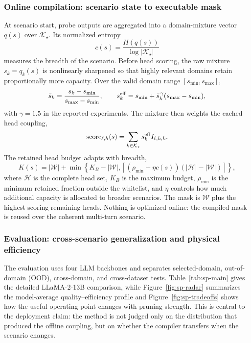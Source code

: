 \documentclass[12pt,a4paper]{article}
\begin{document}
\subsubsection{Online compilation: scenario state to executable mask}
At scenario start, probe outputs are aggregated into a domain-mixture vector $q(s)$ over $\mathcal K_\star$. Its normalized entropy
\begin{equation}
c(s)=\frac{H(q(s))}{\log|\mathcal K_\star|}
\label{eq:sp-breadth}
\end{equation}
measures the breadth of the scenario. Before head scoring, the raw mixture $s_k=q_k(s)$ is nonlinearly sharpened so that highly relevant domains retain proportionally more capacity. Over the valid domain range $[s_{\min},s_{\max}]$,
\begin{equation}
\bar s_k=\frac{s_k-s_{\min}}{s_{\max}-s_{\min}},\qquad
s_k^{\rm eff}=s_{\min}+\bar s_k^{\,\gamma}(s_{\max}-s_{\min}),
\label{eq:sp-effective}
\end{equation}
with $\gamma=1.5$ in the reported experiments. The mixture then weights the cached head coupling,
\begin{equation}
\operatorname{score}_{\ell,h}(s)=\sum_{k\in\mathcal K_\star}s_k^{\rm eff}I_{\ell,h,k}.
\label{eq:sp-score}
\end{equation}
The retained head budget adapts with breadth,
\begin{equation}
K(s)=|\mathcal W|+\min\!\left\{K_B-|\mathcal W|,
\left\lceil(\rho_{\min}+\eta c(s))(|\mathcal H|-|\mathcal W|)\right\rceil\right\},
\label{eq:sp-budget}
\end{equation}
where $\mathcal H$ is the complete head set, $K_B$ is the maximum budget, $\rho_{\min}$ is the minimum retained fraction outside the whitelist, and $\eta$ controls how much additional capacity is allocated to broader scenarios. The mask is $\mathcal W$ plus the highest-scoring remaining heads. Nothing is optimized online: the compiled mask is reused over the coherent multi-turn scenario.

\subsubsection{Evaluation: cross-scenario generalization and physical efficiency}
The evaluation uses four LLM backbones and separates selected-domain, out-of-domain (OOD), cross-domain, and cross-dataset tests. Table~\ref{tab:sp-main} gives the detailed LLaMA-2-13B comparison, while Figure~\ref{fig:sp-radar} summarizes the model-average quality--efficiency profile and Figure~\ref{fig:sp-tradeoffs} shows how the useful operating point changes with pruning strength. This is central to the deployment claim: the method is not judged only on the distribution that produced the offline coupling, but on whether the compiler transfers when the scenario changes.
\end{document}

